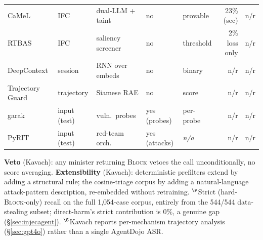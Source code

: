 \begin{table}[tp]
{\begin{tabular}{@{}lllllrr@{}}
CaMeL & IFC & dual-LLM + taint & no & provable & 23\% (sec) & n/r \\
RTBAS & IFC & saliency screener & no & threshold & 2\% loss only & n/r \\
\midrule

DeepContext & session & RNN over embeds & no & binary & n/r & n/r \\
Trajectory Guard & trajectory & Siamese RAE & no & score & n/r & n/r \\
\midrule

garak \cite{garak2024} & input (test) & vuln.\ probes & yes (probes) & per-probe & n/r & n/r \\
PyRIT \cite{pyrit2024} & input (test) & red-team orch. & yes (attacks) & {\em n/a} & n/r & n/r \\

\bottomrule
\end{tabular}%
}

\medskip
\noindent\footnotesize
\textbf{Veto} (Kavach): any minister returning \textsc{Block} vetoes the
call unconditionally, no score averaging.
\textbf{Extensibility} (Kavach): deterministic prefilters extend by adding
a structural rule; the cosine-triage corpus by adding a natural-language
attack-pattern description, re-embedded without retraining.
$^{\P}$Strict (hard-\textsc{Block}-only) recall on the full 1,054-case
corpus, entirely from the 544/544 data-stealing subset; direct-harm's
strict contribution is 0\%, a genuine gap (\S\ref{sec:injecagent}).
$^{\S}$Kavach reports per-mechanism trajectory analysis
(\S\ref{sec:gpt4o}) rather than a single AgentDojo ASR.
\end{table}
